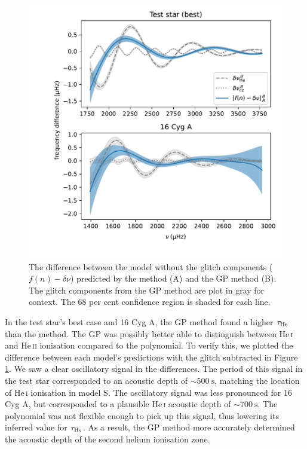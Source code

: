 \begin{figure}[!tbp]
    \centering
    \includegraphics[trim={0.4in 0.2in 0 0},clip]{figures/glitch-res.pdf}
    \caption{The difference between the model without the glitch components (\(f(n) - \delta\nu\)) predicted by the  method (A) and the GP method (B). The glitch components from the GP method are plot in gray for context. The 68 per cent confidence region is shaded for each line.}
    \label{fig:smooth-res}
\end{figure}

In the test star's best case and 16 Cyg A, the GP method found a higher \(\tau_{{\mathrm{He}}}\) than the  method. The GP was possibly better able to distinguish between He\,\textsc{i} and He\,\textsc{ii} ionisation compared to the polynomial. To verify this, we plotted the difference between each model's predictions with the glitch subtracted in Figure \ref{fig:smooth-res}. We saw a clear oscillatory signal in the differences. The period of this signal in the test star corresponded to an acoustic depth of \(\sim \SI{500}{\second}\), matching the location of He\,\textsc{i} ionisation in model S. The oscillatory signal was less pronounced for 16 Cyg A, but corresponded to a plausible He\,\textsc{i} acoustic depth of \(\sim \SI{700}{\second}\). The polynomial was not flexible enough to pick up this signal, thus lowering its inferred value for \(\tau_{{\mathrm{He}}}\). As a result, the GP method more accurately determined the acoustic depth of the second helium ionisation zone.

